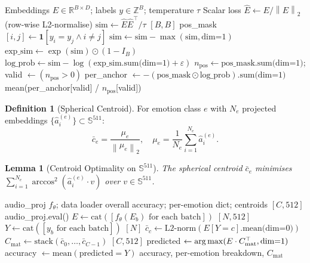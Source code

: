 \documentclass[12pt,a4paper]{article}
\theoremstyle{definition}
\newtheorem{definition}{Definition}[section]
\theoremstyle{plain}
\newtheorem{lemma}[theorem]{Lemma}
\theoremstyle{remark}
\newcommand{\R}{\mathbb{R}}
\newcommand{\Sph}{\mathbb{S}}
\newcommand{\Norm}[1]{\left\|#1\right\|}
\newcommand{\argmax}{\operatornamewithlimits{arg\,max}}
\begin{document}
\begin{algorithm}[H]
\caption{SupCon Loss Computation}
\label{alg:supcon}
\begin{algorithmic}[1]
\Require Embeddings $E \in \R^{B \times D}$; labels $y \in \mathbb{Z}^B$; temperature $\tau$
\Ensure Scalar loss
\State $\hat{E} \gets E / \Norm{E}_2$ (row-wise L2-normalise)
\State $\text{sim} \gets \hat{E}\hat{E}^\top / \tau$ \quad $[B,B]$
\State pos\_mask$[i,j] \gets \mathbf{1}[y_i = y_j \wedge i \ne j]$
\State $\text{sim} \gets \text{sim} - \max(\text{sim}, \text{dim=1})$ 
\State $\text{exp\_sim} \gets \exp(\text{sim}) \odot (1 - I_B)$ 
\State $\text{log\_prob} \gets \text{sim} - \log(\text{exp\_sim.sum(dim=1)} + \varepsilon)$
\State $n_{\text{pos}} \gets \text{pos\_mask.sum(dim=1)}$; valid $\gets (n_{\text{pos}} > 0)$
  \EndIf
\State per\_anchor $\gets -(\text{pos\_mask} \odot \text{log\_prob}).\text{sum(dim=1)}$
\State \Return mean(per\_anchor[valid] / $n_{\text{pos}}$[valid])
\end{algorithmic}
\end{algorithm}

\begin{definition}[Spherical Centroid]
For emotion class $e$ with $N_e$ projected embeddings $\{\hat{a}_i^{(e)}\} \subset \Sph^{511}$:
\[
  \bar{c}_e = \frac{\mu_e}{\Norm{\mu_e}_2}, \quad \mu_e = \frac{1}{N_e}\sum_{i=1}^{N_e}\hat{a}_i^{(e)}.
\]
\end{definition}

\begin{lemma}[Centroid Optimality on $\Sph^{511}$]
The spherical centroid $\bar{c}_e$ minimises $\sum_{i=1}^{N_e} \arccos^2(\hat{a}_i^{(e)} \cdot v)$ over $v \in \Sph^{511}$.
\end{lemma}

\begin{algorithm}[H]
\caption{Emotion Accuracy Evaluation via Centroid Nearest-Neighbour}
\label{alg:centroid_eval}
\begin{algorithmic}[1]
\Require audio\_proj $f_\theta$; data loader
\Ensure overall accuracy; per-emotion dict; centroids $[C, 512]$
\State audio\_proj.eval()
\State $E \gets \text{cat}([f_\theta(E_b) \text{ for each batch}])$ \quad $[N, 512]$
\State $Y \gets \text{cat}([y_b \text{ for each batch}])$ \quad $[N]$
  \State $\bar{c}_c \gets \text{L2-norm}(E[Y{=}c].\text{mean(dim=0)})$
\EndFor
\State $C_{\text{mat}} \gets \text{stack}(\bar{c}_0,\ldots,\bar{c}_{C-1})$ \quad $[C, 512]$
\State predicted $\gets \argmax(E \cdot C_{\text{mat}}^\top, \text{dim=1})$
\State accuracy $\gets \text{mean}(\text{predicted} = Y)$
\State \Return accuracy, per-emotion breakdown, $C_{\text{mat}}$
\end{algorithmic}
\end{algorithm}
\end{document}
